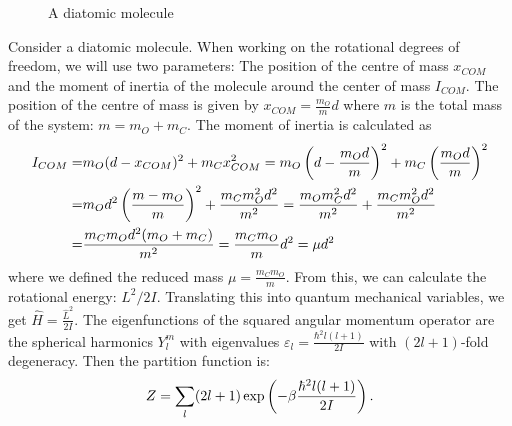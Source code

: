     \begin{wrapfigure}{l}{0.4\textwidth}
        \centering
        \caption{A diatomic molecule}
        \label{fig:diatomic}
    \end{wrapfigure}
    Consider a diatomic molecule. When working on the rotational degrees of freedom, we will use two parameters: The position of the centre of mass $x_{COM}$ and the moment of inertia of the molecule around the center of mass $I_{COM}$. The position of the centre of mass is given by $x_{COM} = \frac{m_O}{m}d$ where $m$ is the total mass of the system: $m = m_O + m_C$. The moment of inertia is calculated as\\
    \begin{align}
        I_{COM} =& m_O(d-x_{COM})^2+m_Cx_{COM}^2 = m_O\left( d-\frac{m_Od}{m} \right)^2+m_C\left( \frac{m_Od}{m} \right)^2 \notag \\
        =& m_Od^2\left( \frac{m-m_O}{m} \right)^2+\frac{m_Cm_O^2d^2}{m^2} = \frac{m_Om_C^2d^2}{m^2}+\frac{m_Cm_O^2d^2}{m^2}\notag \\
        =& \frac{m_Cm_Od^2(m_O+m_C)}{m^2} = \frac{m_Cm_O}{m}d^2 = \mu d^2
    \end{align}
    where we defined the reduced mass $\mu = \frac{m_Cm_O}{m}$. From this, we can calculate the rotational energy: $L^2/2I$. Translating this into quantum mechanical variables, we get $\hat{H} = \frac{\hat{L}^2}{2I}$.
    The eigenfunctions of the squared angular momentum operator are the spherical harmonics $Y_l^m$ with eigenvalues $\varepsilon_l = \frac{\hbar^2 l(l+1)}{2I}$ with $(2l+1)$-fold degeneracy. Then the partition function is:
    \begin{equation}
        Z = \sum_l(2l+1)\exp\left( -\beta\frac{\hbar^2l(l+1)}{2I} \right).
    \end{equation}
